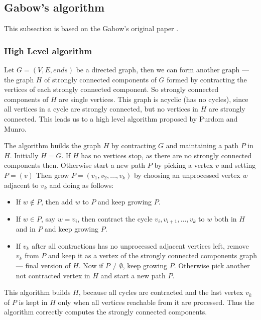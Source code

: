 \documentclass{report}
\theoremstyle{plain}
\theoremstyle{definition}
\theoremstyle{remark}
\numberwithin{definition}{chapter}
\numberwithin{example}{chapter}
\numberwithin{figure}{chapter}
\numberwithin{theorem}{chapter}
\numberwithin{lemma}{chapter}
\begin{document}
\subsection{Gabow's algorithm}

This subsection is based on the Gabow's original paper \cite{Gabow2000107}.

\subsubsection*{High Level algorithm}

Let $G=(V, E, ends)$ be a directed graph, then we can form another graph --- the graph $H$ of strongly connected components of $G$ formed by contracting the vertices of each strongly connected component. So strongly connected components of $H$ are single vertices. This graph is acyclic (has no cycles), since all vertices in a cycle are strongly connected, but no vertices in $H$ are strongly connected. This leads us to a high level algorithm proposed by Purdom and Munro.

The algorithm builds the graph $H$ by contracting $G$ and maintaining a path $P$ in $H$. Initially $H=G$. If $H$ has no vertices stop, as there are no strongly connected components then. Otherwise start a new path $P$ by picking a vertex $v$ and setting $P = (v)$ Then grow $P=(v_1,v_2,...,v_k)$ by choosing an unprocessed vertex $w$ adjacent to $v_k$ and doing as follows:

\begin{itemize}
  \item If $w \not \in P$, then add $w$ to $P$ and keep growing $P$.
  \item If $w \in P$, say $w=v_i$, then contract the cycle $v_i,v_{i+1},...,v_k$ to $w$ both in $H$ and in $P$ and keep growing $P$.
  \item If $v_k$ after all contractions has no unprocessed adjacent vertices left, remove $v_k$ from $P$ and keep it as a vertex of the strongly connected components graph --- final version of $H$. Now if $P \not = \emptyset$, keep growing $P$. Otherwise pick another not contracted vertex in $H$ and start a new path $P$.
\end{itemize}

This algorithm builds $H$, because all cycles are contracted and the last vertex $v_k$ of $P$ is kept in $H$ only when all vertices reachable from it are processed. Thus the algorithm correctly computes the strongly connected components.
\end{document}
